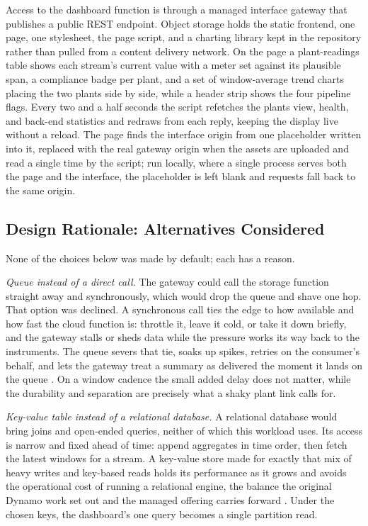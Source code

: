 \documentclass[conference]{IEEEtran}
\begin{document}
Access to the dashboard function is through a managed interface gateway that publishes a public REST endpoint. Object storage holds the static frontend, one page, one stylesheet, the page script, and a charting library kept in the repository rather than pulled from a content delivery network. On the page a plant-readings table shows each stream's current value with a meter set against its plausible span, a compliance badge per plant, and a set of window-average trend charts placing the two plants side by side, while a header strip shows the four pipeline flags. Every two and a half seconds the script refetches the plants view, health, and back-end statistics and redraws from each reply, keeping the display live without a reload. The page finds the interface origin from one placeholder written into it, replaced with the real gateway origin when the assets are uploaded and read a single time by the script; run locally, where a single process serves both the page and the interface, the placeholder is left blank and requests fall back to the same origin.

\subsection{Design Rationale: Alternatives Considered}

None of the choices below was made by default; each has a reason.

\textit{Queue instead of a direct call.} The gateway could call the storage function straight away and synchronously, which would drop the queue and shave one hop. That option was declined. A synchronous call ties the edge to how available and how fast the cloud function is: throttle it, leave it cold, or take it down briefly, and the gateway stalls or sheds data while the pressure works its way back to the instruments. The queue severs that tie, soaks up spikes, retries on the consumer's behalf, and lets the gateway treat a summary as delivered the moment it lands on the queue \cite{hohpe2003}. On a window cadence the small added delay does not matter, while the durability and separation are precisely what a shaky plant link calls for.

\textit{Key-value table instead of a relational database.} A relational database would bring joins and open-ended queries, neither of which this workload uses. Its access is narrow and fixed ahead of time: append aggregates in time order, then fetch the latest windows for a stream. A key-value store made for exactly that mix of heavy writes and key-based reads holds its performance as it grows and avoids the operational cost of running a relational engine, the balance the original Dynamo work set out and the managed offering carries forward \cite{decandia2007, elhemali2022}. Under the chosen keys, the dashboard's one query becomes a single partition read.
\end{document}
